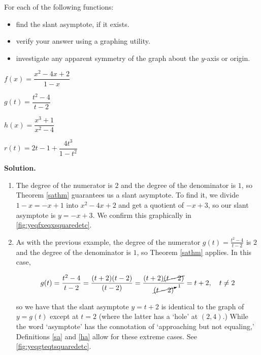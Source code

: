 \begin{ex} \label{saexample}  For each of the following functions:

\begin{itemize}

\item find the slant asymptote, if it exists.

\item  verify your answer using a graphing utility.

\item  investigate any apparent symmetry of the graph about the $y$-axis or origin.

\end{itemize}

\begin{shortenumerate}[MMMMMM]
\item  $f(x) = \dfrac{x^2-4x+2}{1-x}$  
\item  \label{sacancel} $g(t) = \dfrac{t^2-4}{t-2}$
\item  $h(x) = \dfrac{x^3+1}{x^2-4}$
\item  $r(t) = 2t-1+\dfrac{4t^3}{1-t^2}$ 
\end{shortenumerate}

{\bf Solution.}

\begin{enumerate}

\item  The degree of the numerator is $2$ and the degree of the denominator is $1$, so Theorem \ref{sathm} guarantees us a slant asymptote.  To find it, we divide $1-x = -x+1$ into $x^2-4x+2$ and get a quotient of $-x+3$, so our slant asymptote is $y=-x+3$.  We confirm this graphically in \autoref{fig:yeqfxeqxsquaredetc}.

\item  As with the previous example, the degree of the numerator $g(t) = \frac{t^2-4}{t-2}$ is $2$ and the degree of the denominator is $1$, so Theorem \ref{sathm} applies.  In this case, 

\[ g(t) = \frac{t^2-4}{t-2} = \frac{(t+2)(t-2)}{(t-2)} = \frac{(t+2) \cancel{(t-2)}}{\cancelto{1}{(t-2)}} = t+2, \quad t \neq 2\]

so we have that the slant asymptote $y=t+2$ is identical to the graph of $y=g(t)$ except at $t=2$ (where the latter has a `hole' at $(2,4)$.) While the word `asymptote' has the connotation of `approaching but not equaling,' Definitions \ref{sa} and  \ref{ha} allow for these extreme cases. See \autoref{fig:yeqgteqtsquaredetc}.


\end{enumerate}
\end{ex}
